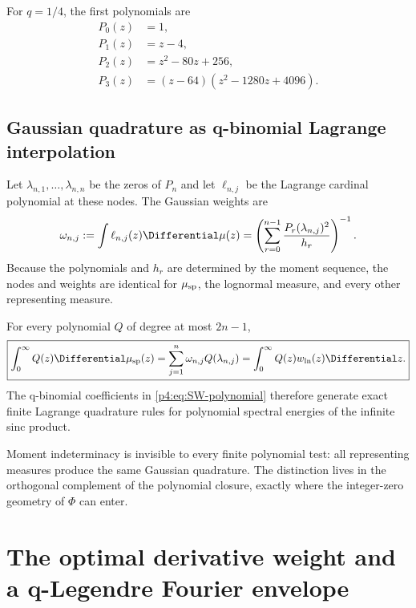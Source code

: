 \documentclass[11pt,oneside]{article}
\theoremstyle{definition}
\theoremstyle{remark}
\begin{document}
For $q=1/4$, the first polynomials are
\begin{align}
 P_0(z)&=1,\nonumber\\
 P_1(z)&=z-4,\nonumber\\
 P_2(z)&=z^2-80z+256,\nonumber\\
 P_3(z)&=(z-64)(z^2-1280z+4096).
 \label{p4:eq:first-SW-polynomials}
\end{align}

\subsection{Gaussian quadrature as q-binomial Lagrange interpolation}

Let $\lambda_{n,1},\ldots,\lambda_{n,n}$ be the zeros of $P_n$ and let
$\ell_{n,j}$ be the Lagrange cardinal polynomial at these nodes.  The Gaussian weights are
\begin{equation}
 \omega_{n,j}:=\int\ell_{n,j}(z)\Differential\mu(z)
 =\left(\sum_{r=0}^{n-1}\frac{P_r(\lambda_{n,j})^2}{h_r}\right)^{-1}.
 \label{p4:eq:Christoffel-weights}
\end{equation}
Because the polynomials and $h_r$ are determined by the moment sequence, the nodes and
weights are identical for $\mu_{\rm sp}$, the lognormal measure, and every other representing
measure.

\begin{corollary}
\label{p4:cor:Gaussian-quadrature}
For every polynomial $Q$ of degree at most $2n-1$,
\begin{equation}
 \boxed{
 \int_0^\infty Q(z)\Differential\mu_{\rm sp}(z)
 =\sum_{j=1}^{n}\omega_{n,j}Q(\lambda_{n,j})
 =\int_0^\infty Q(z)w_{\rm ln}(z)\Differential z.}
 \label{p4:eq:Gaussian-quadrature}
\end{equation}
The q-binomial coefficients in \eqref{p4:eq:SW-polynomial} therefore generate exact finite
Lagrange quadrature rules for polynomial spectral energies of the infinite sinc product.
\end{corollary}

\begin{remark}
Moment indeterminacy is invisible to every finite polynomial test: all representing measures
produce the same Gaussian quadrature.  The distinction lives in the orthogonal complement of
the polynomial closure, exactly where the integer-zero geometry of $\Phi$ can enter.
\end{remark}

\section{The optimal derivative weight and a q-Legendre Fourier envelope}
\label{p4:sec:carleman}
\end{document}
